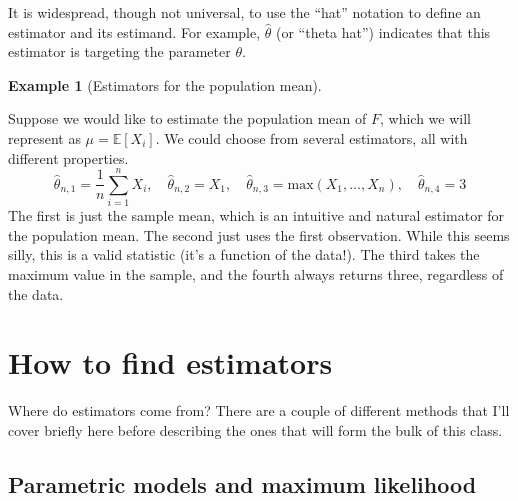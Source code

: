 \documentclass[
  letterpaper,
  DIV=11,
  numbers=noendperiod]{scrreprt}
\newcommand{\E}{\mathbb{E}}
\theoremstyle{definition}
\theoremstyle{plain}
\theoremstyle{definition}
\newtheorem{example}{Example}[chapter]
\theoremstyle{remark}
\begin{document}
\begin{tcolorbox}[enhanced jigsaw, title=\textcolor{quarto-callout-note-color}{\faInfo}\hspace{0.5em}{Note}, breakable, titlerule=0mm, opacityback=0, rightrule=.15mm, bottomrule=.15mm, colframe=quarto-callout-note-color-frame, coltitle=black, colbacktitle=quarto-callout-note-color!10!white, bottomtitle=1mm, toptitle=1mm, colback=white, arc=.35mm, opacitybacktitle=0.6, toprule=.15mm, leftrule=.75mm, left=2mm]

It is widespread, though not universal, to use the ``hat'' notation to
define an estimator and its estimand. For example, \(\widehat{\theta}\)
(or ``theta hat'') indicates that this estimator is targeting the
parameter \(\theta\).

\end{tcolorbox}

\leavevmode{}%
\begin{example}[Estimators for the population mean]\label{exm-mean-est}

Suppose we would like to estimate the population mean of \(F\), which we
will represent as \(\mu = \E[X_i]\). We could choose from several
estimators, all with different properties. \[
\widehat{\theta}_{n,1} = \frac{1}{n} \sum_{i=1}^n X_i, \quad \widehat{\theta}_{n,2} = X_1, \quad \widehat{\theta}_{n,3} = \text{max}(X_1,\ldots,X_n), \quad \widehat{\theta}_{n,4} = 3
\] The first is just the sample mean, which is an intuitive and natural
estimator for the population mean. The second just uses the first
observation. While this seems silly, this is a valid statistic (it's a
function of the data!). The third takes the maximum value in the sample,
and the fourth always returns three, regardless of the data.

\end{example}

\hypertarget{how-to-find-estimators}{%
\section{How to find estimators}\label{how-to-find-estimators}}

Where do estimators come from? There are a couple of different methods
that I'll cover briefly here before describing the ones that will form
the bulk of this class.

\hypertarget{parametric-models-and-maximum-likelihood}{%
\subsection{Parametric models and maximum
likelihood}\label{parametric-models-and-maximum-likelihood}}
\end{document}
